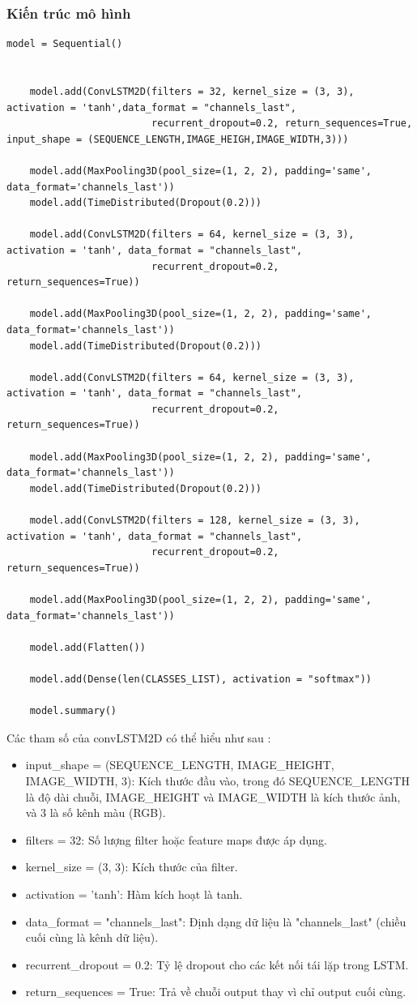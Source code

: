 \subsubsection{Kiến trúc mô hình}
\begin{lstlisting}[style=codePython]
    model = Sequential()


    model.add(ConvLSTM2D(filters = 32, kernel_size = (3, 3), activation = 'tanh',data_format = "channels_last",
                         recurrent_dropout=0.2, return_sequences=True, input_shape = (SEQUENCE_LENGTH,IMAGE_HEIGH,IMAGE_WIDTH,3)))

    model.add(MaxPooling3D(pool_size=(1, 2, 2), padding='same', data_format='channels_last'))
    model.add(TimeDistributed(Dropout(0.2)))

    model.add(ConvLSTM2D(filters = 64, kernel_size = (3, 3), activation = 'tanh', data_format = "channels_last",
                         recurrent_dropout=0.2, return_sequences=True))

    model.add(MaxPooling3D(pool_size=(1, 2, 2), padding='same', data_format='channels_last'))
    model.add(TimeDistributed(Dropout(0.2)))

    model.add(ConvLSTM2D(filters = 64, kernel_size = (3, 3), activation = 'tanh', data_format = "channels_last",
                         recurrent_dropout=0.2, return_sequences=True))

    model.add(MaxPooling3D(pool_size=(1, 2, 2), padding='same', data_format='channels_last'))
    model.add(TimeDistributed(Dropout(0.2)))

    model.add(ConvLSTM2D(filters = 128, kernel_size = (3, 3), activation = 'tanh', data_format = "channels_last",
                         recurrent_dropout=0.2, return_sequences=True))

    model.add(MaxPooling3D(pool_size=(1, 2, 2), padding='same', data_format='channels_last'))

    model.add(Flatten())

    model.add(Dense(len(CLASSES_LIST), activation = "softmax"))

    model.summary()

\end{lstlisting}
Các tham số của convLSTM2D có thể hiểu như sau : 
\begin{itemize}
    \item input\_shape = (SEQUENCE\_LENGTH, IMAGE\_HEIGHT, IMAGE\_WIDTH, 3): Kích thước đầu vào, trong đó SEQUENCE\_LENGTH là độ dài chuỗi, IMAGE\_HEIGHT và IMAGE\_WIDTH là kích thước ảnh, và 3 là số kênh màu (RGB).
    \item filters = 32: Số lượng filter hoặc feature maps được áp dụng.
    \item kernel\_size = (3, 3): Kích thước của filter.
    \item activation = 'tanh': Hàm kích hoạt là tanh.
    \item data\_format = "channels\_last": Định dạng dữ liệu là "channels\_last" (chiều cuối cùng là kênh dữ liệu).
    \item recurrent\_dropout = 0.2: Tỷ lệ dropout cho các kết nối tái lặp trong LSTM.
    \item return\_sequences = True: Trả về chuỗi output thay vì chỉ output cuối cùng.
\end{itemize}
